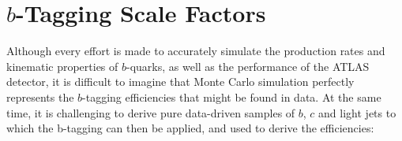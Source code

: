 




\section{$b$-Tagging Scale Factors}
\label{sec:SF}
Although every effort is made to accurately simulate the production rates and
kinematic properties of $b$-quarks, as well as the performance of the ATLAS
detector, it is difficult to imagine that Monte Carlo simulation perfectly represents
the $b$-tagging efficiencies that might be found in data.  At the same time, it
is challenging to derive pure data-driven samples of $b$, $c$ and light jets to which
the b-tagging can then be applied, and used to derive the efficiencies:

